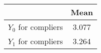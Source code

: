 \begin{tabular}{l*{1}{c}}
\hline\hline
            &        Mean\\
\hline
$ Y_0 $ for compliers&       3.077\\
$ Y_1 $ for compliers&       3.264\\
\hline\hline
\end{tabular}

